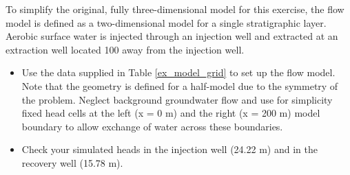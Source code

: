 To simplify the original, fully three-dimensional model for this exercise, 
the flow model is defined as a two-dimensional model for a single stratigraphic layer. Aerobic surface water is injected through an injection well and extracted 
at an extraction well located 100 away from the injection well. 

\begin{itemize}

\item Use the data supplied in Table \ref{ex_model_grid} to set up the flow model. 
Note that the geometry is defined for a half-model due to the symmetry of the problem.
Neglect background groundwater flow and use for simplicity fixed head cells at the left 
(x = 0 m) and the right (x = 200 m) model boundary to allow 
exchange of water across these boundaries.

\item Check your simulated heads in the injection well (24.22 m) and in the recovery well (15.78 m).

\end{itemize}

